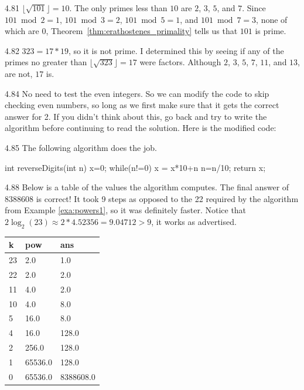 \begin{Answer}{4.81}
$\lfloor \sqrt{101}\rfloor=10$.  The only primes less than $10$ are $2$, $3$, $5$, and $7$.
Since $101\bmod 2=1$, $101\bmod 3 = 2$, $101\bmod 5 = 1$, and $101\bmod 7 = 3$, none of
which are $0$, Theorem~\ref{thm:erathostenes_primality} tells us that $101$ is prime.
\end{Answer}
\begin{Answer}{4.82}
$323=17*19$, so it is not prime.  I determined this by seeing if any of the primes
no greater than $\lfloor\sqrt{323}\rfloor=17$ were factors.
Although $2$, $3$, $5$, $7$, $11$, and $13$, are not, $17$ is.
\end{Answer}
\begin{Answer}{4.84}
No need to test the even integers. So
we can modify the code to skip checking even numbers,
so long as we first make sure that it gets the correct
answer for 2. If you didn't think about this,
go back and try to write the algorithm before
continuing to read the solution.
Here is the modified code:
\end{Answer}
\begin{Answer}{4.85}
The following algorithm does the job.
\begin{code}
	int reverseDigits(int n) {
		x=0;
		while(n!=0) {
		    x = x*10+n%
		    n=n/10;
		}
		return x;
	}
\end{code}
\end{Answer}
\begin{Answer}{4.88}
Below is a table of the values the algorithm computes.
The final answer of 8388608 is correct!
It took 9 steps as opposed to the 22 required by the
algorithm from Example \ref{exa:powers1}, so it was
definitely faster. Notice that
$2 \log_2(23) \approx 2*4.52356=9.04712>9$,
it works as advertised.

\begin{tabular}{|l|l|l|}
\hline
k&pow&ans\\
\hline
23&2.0&1.0\\
22&2.0&2.0\\
11&4.0&2.0\\
10&4.0&8.0\\
5&16.0&8.0\\
4&16.0&128.0\\
2&256.0&128.0\\
1&65536.0&128.0\\
0&65536.0&8388608.0\\
\hline
\end{tabular}
\end{Answer}
